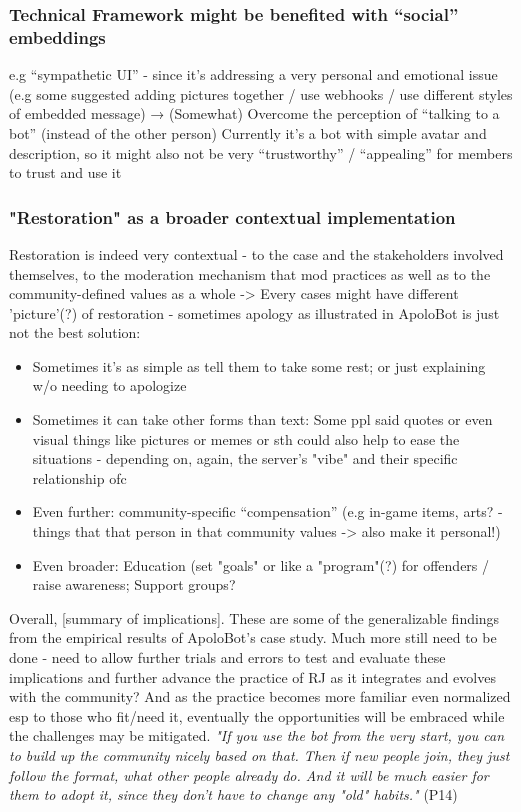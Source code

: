 \subsubsection{Technical Framework might be benefited with “social” embeddings}
e.g “sympathetic UI” - since it’s addressing a very personal and emotional issue (e.g some suggested adding pictures together / use webhooks / use different styles of embedded message)
→ (Somewhat) Overcome the perception of “talking to a bot” (instead of the other person)
Currently it’s a bot with simple avatar and description, so it might also not be very “trustworthy” / “appealing” for members to trust and use it

\subsubsection{"Restoration" as a broader contextual implementation} Restoration is indeed very contextual - to the case and the stakeholders involved themselves, to the moderation mechanism that mod practices as well as to the community-defined values as a whole -> Every cases might have different 'picture'(?) of restoration - sometimes apology as illustrated in ApoloBot is just not the best solution:
\begin{itemize}
    \item Sometimes it's as simple as tell them to take some rest; or just explaining w/o needing to apologize
    \item Sometimes it can take other forms than text: Some ppl said quotes or even visual things like pictures or memes or sth could also help to ease the situations - depending on, again, the server's "vibe" and their specific relationship ofc
    \item Even further: community-specific “compensation” (e.g in-game items, arts? - things that that person in that community values -> also make it personal!)
    \item Even broader: Education (set "goals" or like a "program"(?) for offenders / raise awareness; Support groups?
\end{itemize}

Overall, [summary of implications]. These are some of the generalizable findings from the empirical results of ApoloBot's case study. Much more still need to be done - need to allow further trials and errors to test and evaluate these implications and further advance the practice of RJ as it integrates and evolves with the community? And as the practice becomes more familiar even normalized esp to those who fit/need it, eventually the opportunities will be embraced while the challenges may be mitigated. \textit{"If you use the bot from the very start, you can to build up the community nicely based on that. Then if new people join, they just follow the format, what other people already do. And it will be much easier for them to adopt it, since they don't have to change any "old" habits."} (P14)
